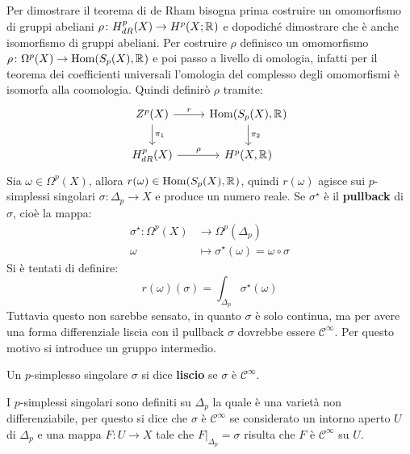 Per dimostrare il teorema di de Rham bisogna prima costruire un omomorfismo di
gruppi abeliani $ \rho \colon H^p_{dR}(X) \to H^p(X;\mathbb{R}^{}) $ e dopodiché dimostrare che è
anche isomorfismo di gruppi abeliani. Per costruire $ \rho $ definisco un omomorfismo
$ \rho \colon \Omega^p(X) \to \mathrm{Hom}( S_p(X), \mathbb{R}^{}) $ e poi passo a livello di omologia, infatti
per il teorema dei coefficienti universali l'omologia del complesso degli
omomorfismi è isomorfa alla coomologia. Quindi definirò $ \rho $ tramite:
\[
  \begin{tikzcd}
    Z^p(X) \rar{r} \dar{\pi_1} & \hom{S_p(X), \RN{}} \dar{\pi_2} \\
    H^p_{dR}(X) \rar{\rho} & H^p(X, \RN{})
  \end{tikzcd}
\]
Sia $ \omega \in \Omega^p(X) $, allora $ r(\omega) \in \mathrm{Hom}( S_p(X), \mathbb{R}^{}) $, quindi $ r(\omega) $ agisce
sui $ p $-simplessi singolari $ \sigma \colon \Delta_p \to X $ e produce un numero reale.
Se $ \sigma^\star $ è il \textbf{pullback} di $ \sigma $, cioè la mappa:
\begin{align*}
  \sigma^\star \colon \Omega^p(X) & \to \Omega^p(\Delta_p) \\
  \omega & \mapsto \sigma^\star(\omega) = \omega \circ \sigma
\end{align*}
Si è tentati di definire:
\[
  r(\omega)(\sigma) = \int_{\Delta_p} \sigma^\star(\omega)
\]
Tuttavia questo non sarebbe sensato, in quanto $ \sigma $ è solo continua, ma per
avere una forma differenziale liscia con il pullback $ \sigma $ dovrebbe essere $ \mathcal{C}^\infty $.
Per questo motivo si introduce un gruppo intermedio.
\begin{definition}
  Un $ p $-simplesso singolare $ \sigma $ si dice \textbf{liscio}
  se $ \sigma $ è $ \mathcal{C}^\infty $.
\end{definition}
\begin{osservation}
  I $ p $-simplessi singolari sono definiti su $ \Delta_p $ la quale è una varietà
  non differenziabile, per questo si dice che $ \sigma $ è
  $ \mathcal{C}^\infty $ se considerato un intorno aperto $ U $ di $ \Delta_p $ e una
  mappa $ F \colon U \to X $ tale che $ F\lvert_{\Delta_p} = \sigma $ risulta che
  $ F $ è $ \mathcal{C}^\infty $ su $ U $.
\end{osservation}
